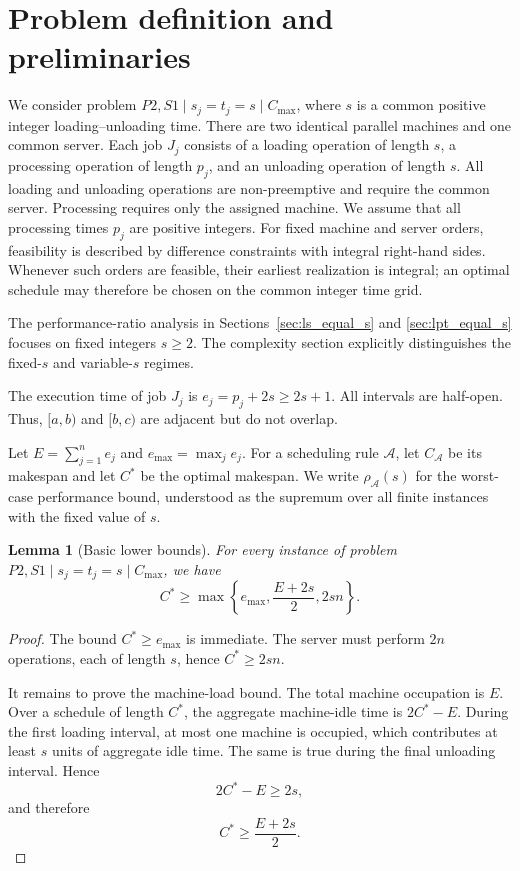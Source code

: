 \documentclass[11pt]{article}
\newtheorem{lemma}{Lemma}
\begin{document}
\section{Problem definition and preliminaries}
\label{sec:prelim}

We consider problem \(P2,S1\mid s_j=t_j=s\mid C_{\max}\), where \(s\) is a common
positive integer loading--unloading time. There are two identical parallel machines
and one common server. Each job \(J_j\) consists of a loading operation of length
\(s\), a processing operation of length \(p_j\), and an unloading operation of
length \(s\). All loading and unloading operations are non-preemptive and require
the common server. Processing requires only the assigned machine. We assume that
all processing times \(p_j\) are positive integers. For fixed machine and server
orders, feasibility is described by difference constraints with integral right-hand
sides. Whenever such orders are feasible, their earliest realization is integral; an
optimal schedule may therefore be chosen on the common integer time grid.

The performance-ratio analysis in Sections~\ref{sec:ls_equal_s} and
\ref{sec:lpt_equal_s} focuses on fixed integers \(s\ge2\). The complexity section
explicitly distinguishes the fixed-\(s\) and variable-\(s\) regimes.

The execution time of job \(J_j\) is \(e_j=p_j+2s\ge2s+1\).
All intervals are half-open. Thus, \([a,b)\) and \([b,c)\) are adjacent but do not
overlap.

Let \(E=\sum_{j=1}^n e_j\) and \(e_{\max}=\max_j e_j\).
For a scheduling rule \(\mathcal A\), let \(C_{\mathcal A}\) be its makespan and let
\(C^*\) be the optimal makespan. We write \(\rho_{\mathcal A}(s)\) for the
worst-case performance bound, understood as the supremum over all finite instances
with the fixed value of \(s\).

\begin{lemma}[Basic lower bounds]
\label{lem:basic_lb_s}
For every instance of problem  \(P2,S1\mid s_j=t_j=s\mid C_{\max}\), we have
\[
C^*\ge
\max\left\{
e_{\max},
\frac{E+2s}{2},
2sn
\right\}.
\]
\end{lemma}

\begin{proof}
The bound \(C^*\ge e_{\max}\) is immediate. The server must perform \(2n\)
operations, each of length \(s\), hence \(C^*\ge2sn\).

It remains to prove the machine-load bound. The total machine occupation is \(E\).
Over a schedule of length \(C^*\), the aggregate machine-idle time is
\(2C^*-E\). During the first loading interval, at most one machine is occupied,
which contributes at least \(s\) units of aggregate idle time. The same is true
during the final unloading interval. Hence
\[
2C^*-E\ge2s,
\]
and therefore
\[
C^*\ge \frac{E+2s}{2}.
\]
\end{proof}
\end{document}
